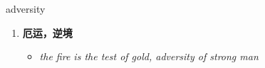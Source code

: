 
\begin{frame}
{\huge adversity}
\begin{center}
\begin{enumerate}\Large
  \item \textbf{厄运，逆境}
  \begin{itemize}
    \item \em{\Large{the fire is the test of gold, adversity of strong man}}
  \end{itemize}
\end{enumerate}
\end{center}
\end{frame}
